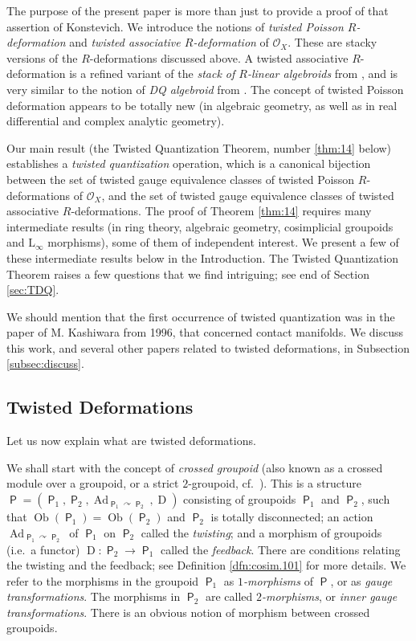 \documentclass[a4paper, 10pt]{amsart}
\theoremstyle{definition}
\numberwithin{equation}{section}
\newcommand{\opn}{\operatorname}
\newcommand{\cat}[1]{\operatorname{\mathsf{#1}}}
\newcommand{\mcal}[1]{\mathcal{#1}}
\newcommand{\mrm}[1]{\mathrm{#1}}
\newcommand{\crvar}{\curvearrowright}
\begin{document}
The purpose of the present paper is more than just to provide a proof
of that assertion of Konstevich. 
We introduce the notions of {\em twisted Poisson $R$-deformation} and 
{\em twisted associative $R$-deformation} of $\mcal{O}_X$. 
These are stacky versions of the $R$-deformations discussed above. A 
twisted associative $R$-deformation is a refined variant of the {\em stack
of $R$-linear algebroids} from \cite{Ko2}, and is very similar to
the notion of {\em DQ algebroid} from \cite{KS2}. 
The concept of twisted Poisson deformation appears to be totally new (in
algebraic geometry, as well as in real differential and complex analytic
geometry). 

Our main result (the Twisted Quantization Theorem, number \ref{thm:14} below)
establishes a {\em twisted quantization} operation,
which is a canonical bijection between the set of twisted gauge equivalence
classes of twisted Poisson $R$-deformations of $\mcal{O}_X$, and the set of
twisted gauge equivalence classes of twisted associative $R$-deformations.
The proof of Theorem \ref{thm:14} requires many
intermediate results (in ring theory, algebraic geometry, cosimplicial
groupoids and $\mrm{L}_{\infty}$ morphisms), some of them of
independent interest. We present a few of these intermediate results below in
the Introduction. 
The Twisted Quantization Theorem raises a few questions that we find
intriguing; see end of Section \ref{sec:TDQ}.

We should mention that the first occurrence of twisted quantization was in
the paper \cite{Ka} of M. Kashiwara from 1996, that concerned contact 
manifolds. We discuss this work, and several other papers related to twisted
deformations, in Subsection \ref{subsec:discuss}. 


\subsection{Twisted Deformations} \label{subsec:tw.defs}
Let us now explain what are twisted deformations. 

We shall start with the concept of {\em crossed groupoid} (also known as a
crossed module over a groupoid, or a strict $2$-groupoid, cf.\ \cite{Ye7, Bw}).
This is a structure 
$\cat{P} = ( \cat{P}_1, \cat{P}_2, 
\opn{Ad}_{\cat{P}_1 \crvar \cat{P}_{2}}, \opn{D} )$
consisting of groupoids $\cat{P}_1$ and $\cat{P}_{2}$, such that 
$\opn{Ob}(\cat{P}_1) = \opn{Ob}(\cat{P}_2)$ and $\cat{P}_2$ is totally
disconnected; an action $\opn{Ad}_{\cat{P}_1 \crvar \cat{P}_{2}}$ of 
$\cat{P}_1$ on $\cat{P}_{2}$ called the {\em twisting}; and a morphism of
groupoids  (i.e.\  a functor) $\opn{D} : \cat{P}_{2} \to \cat{P}_{1}$ called the
{\em feedback}. There are conditions relating the twisting and the feedback; see
Definition \ref{dfn:cosim.101} for more details. 
We refer to the morphisms in the groupoid $\cat{P}_1$ as {\em $1$-morphisms}
of $\cat{P}$, or as {\em gauge transformations}. The morphisms in
$\cat{P}_2$ are called {\em $2$-morphisms}, or {\em inner gauge
transformations}. There is an obvious notion of morphism between crossed
groupoids.
\end{document}
